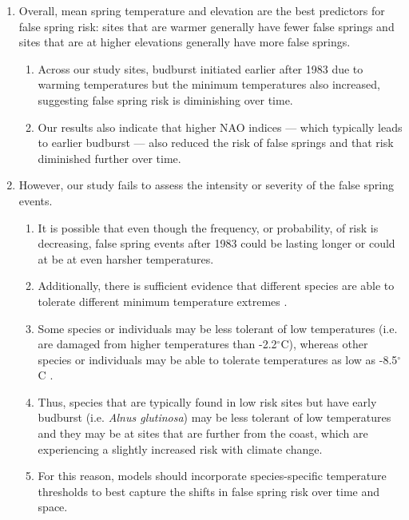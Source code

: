 \documentclass{article}\usepackage[]{graphicx}\usepackage[]{color}
\begin{document}
\begin{enumerate}
\item Overall, mean spring temperature and elevation are the best predictors for false spring risk: sites that are warmer generally have fewer false springs and sites that are at higher elevations generally have more false springs.
  \begin{enumerate}
  \item Across our study sites, budburst initiated earlier after 1983 due to warming temperatures but the minimum temperatures also increased, suggesting false spring risk is diminishing over time. 
  \item Our results also indicate that higher NAO indices --- which typically leads to earlier budburst --- also reduced the risk of false springs and that risk diminished further over time.
  \end{enumerate}
\item However, our study fails to assess the intensity or severity of the false spring events. 
  \begin{enumerate}
  \item It is possible that even though the frequency, or probability, of risk is decreasing, false spring events after 1983 could be lasting longer or could at be at even harsher temperatures.
  \item Additionally, there is sufficient evidence that different species are able to tolerate different minimum temperature extremes \citep{Lenz2013, Korner2016, Zhuo2018}.
  \item Some species or individuals may be less tolerant of low temperatures (i.e. are damaged from higher temperatures than -2.2$^{\circ}$C), whereas other species or individuals may be able to tolerate temperatures as low as -8.5$^{\circ}$C \citep{Lenz2016}.
  \item Thus, species that are typically found in low risk sites but have early budburst (i.e. \textit{Alnus glutinosa}) may be less tolerant of low temperatures and they may be at sites that are further from the coast, which are experiencing a slightly increased risk with climate change. 
  \item For this reason, models should incorporate species-specific temperature thresholds to best capture the shifts in false spring risk over time and space. 
  \end{enumerate}


\end{enumerate}
\end{document}
